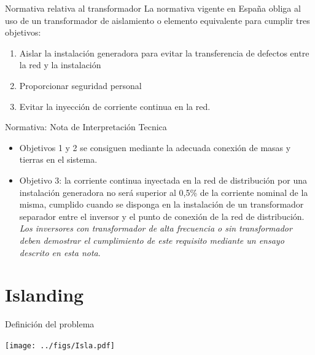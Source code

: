 \documentclass[aspectratio=169, usenames,svgnames,dvipsnames]{beamer}
\begin{document}
\begin{frame}[label={sec:orgb04a2a4}]{Normativa relativa al transformador}
La normativa vigente en España obliga al uso de un transformador de aislamiento o elemento equivalente para cumplir tres objetivos:

\begin{enumerate}
\item Aislar la instalación generadora para evitar la transferencia de defectos entre la red y la instalación

\item Proporcionar seguridad personal

\item Evitar la inyección de corriente continua en la red.
\end{enumerate}
\end{frame}

\begin{frame}[label={sec:org6166d6f}]{Normativa: Nota de Interpretación Tecnica}
\begin{itemize}
\item Objetivos 1 y 2 se consiguen mediante la adecuada conexión de masas y tierras en el sistema.

\item Objetivo 3: \guillemotleft{}\alert{la corriente continua inyectada en la red de distribución por una instalación generadora no será superior al 0,5\% de la corriente nominal de la misma}\guillemotright{}, cumplido \guillemotleft{}\alert{cuando se disponga en la instalación de un transformador separador entre el inversor y el punto de conexión de la red de distribución}\guillemotright{}. \emph{Los inversores con transformador de alta frecuencia o sin transformador deben demostrar el cumplimiento de este requisito mediante un ensayo descrito en esta nota}.
\end{itemize}
\end{frame}

\section{Islanding}
\label{sec:orgf237ffd}
\begin{frame}[label={sec:org3df7c84}]{Definición del problema}
\begin{center}
\texttt{[image: ../figs/Isla.pdf]}
\end{center}
\end{frame}
\end{document}
